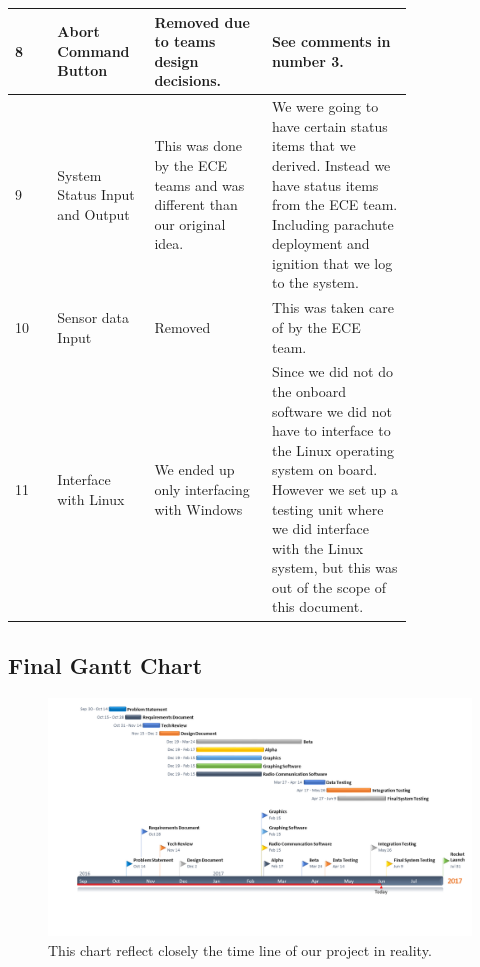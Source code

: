 \documentclass[10pt,draftclsnofoot,onecolumn,retainorgcmds]{IEEEtran}
\begin{document}
\begin{tabular}{ |p{0.09\linewidth}|p{0.15\linewidth}|p{0.25\linewidth}|p{0.30\linewidth}| }
	\hline
	8 & Abort Command Button & Removed due to teams design decisions. & See comments in number 3.\\
	\hline
	9 & System Status Input and Output & This was done by the ECE teams and was different than our original idea. & We were going to have certain status items that we derived. Instead we have status items from the ECE team. Including parachute deployment and ignition that we log to the system.\\
	\hline
	10 & Sensor data Input & Removed & This was taken care of by the ECE team.\\
	\hline
	11 & Interface with Linux & We ended up only interfacing with Windows & Since we did not do the onboard software we did not have to interface to the Linux operating system on board. However we set up a testing unit where we did interface with the Linux system, but this was out of the scope of this document.\\
	\hline
\end{tabular}

\subsection{Final Gantt Chart}
\begin{figure}
	\caption{This chart reflect closely the time line of our project in reality. }
	\centering
	\includegraphics[scale=.50]{NewGanttChartHyro}
\end{figure}
\end{document}
